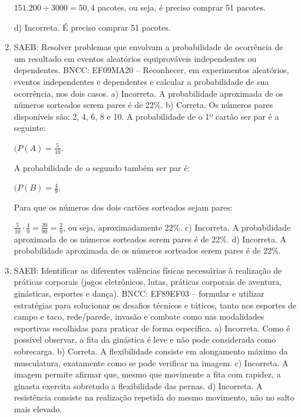 \begin{enumerate}
$151.200 \div 3 000 = 50,4$ pacotes, ou seja, é preciso comprar 51 pacotes.

d) Incorreta. É preciso comprar 51 pacotes.

\item
SAEB: Resolver problemas que envolvam a probabilidade de
ocorrência de um resultado em eventos aleatórios equiprováveis
independentes ou dependentes.
BNCC: EF09MA20 -- Reconhecer, em experimentos aleatórios, eventos
independentes e dependentes e calcular a probabilidade de sua
ocorrência, nos dois casos.
a) Incorreta. A probabilidade aproximada de os números sorteados serem pares é de 22\%.
b) Correta. Os números pares disponíveis são: 2, 4, 6, 8 e 10. 
A probabilidade de o 1º cartão ser par é a seguinte: 

$(P(A) = \frac{5}{10}$. 

A probabilidade de o segundo também ser par é:

$(P(B) = \frac{4}{9}$. 

Para que os números dos dois cartões sorteados sejam pares: 

$\frac{5}{10} \cdot \frac{4}{9} = \frac{20}{90} = \frac{2}{9}$, ou seja, 
aproximadamente 22\%.
c) Incorreta. A probabilidade aproximada de os números sorteados serem pares é de 22\%.
d) Incorreta. A probabilidade aproximada de os números sorteados serem pares é de 22\%.

\item
SAEB: Identificar as diferentes valências físicas necessárias à
realização de práticas corporais (jogos eletrônicos, lutas, práticas
corporais de aventura, ginásticas, esportes e dança).
 BNCC: EF89EF03 -- formular e utilizar estratégias para solucionar os desafios técnicos e táticos, tanto nos esportes de campo e taco, rede/parede, invasão e combate como nas modalidades esportivas escolhidas para praticar de forma específica. a) Incorreta. Como é possível observar, a fita da ginástica é leve e não pode considerada como sobrecarga. b) Correta. A flexibilidade consiste em alongamento máximo da musculatura, exatamente como se pode verificar na imagem. c) Incorreta. A imagem permite afirmar que, mesmo que movimente a fita com rapidez, a ginasta exercita sobretudo a flexibilidade das pernas. d) Incorreta. A resistência consiste na realização repetida do mesmo movimento, não no salto mais elevado.


\end{enumerate}
